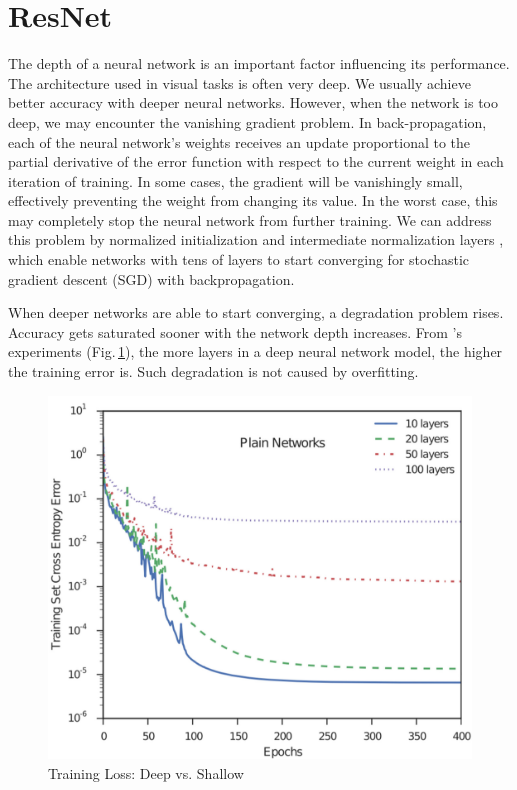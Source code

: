 \section{ResNet}

The depth of a neural network is an important factor influencing its performance. The architecture used in visual tasks is often very deep. We usually achieve better accuracy with deeper neural networks. However, when the network is too deep, we may encounter the vanishing gradient problem. In back-propagation, each of the neural network's weights receives an update proportional to the partial derivative of the error function with respect to the current weight in each iteration of training. In some cases, the gradient will be vanishingly small, effectively preventing the weight from changing its value. In the worst case, this may completely stop the neural network from further training. We can address this problem by normalized initialization and intermediate normalization layers \citep{Glorot10understandingthe}, which enable networks with tens of layers to start converging for stochastic gradient descent (SGD) with backpropagation. 

When deeper networks are able to start converging, a degradation problem rises. Accuracy gets saturated sooner with the network depth increases. From \citeauthor{Srivastava2015}'s experiments \cite{Srivastava2015}  (Fig.\,\ref{deeploss}), the more layers in a deep neural network model, the higher the training error is. Such degradation is not caused by overfitting.

\begin{figure}[h]
	\centering
	\includegraphics[scale=0.5]{Figs/deeploss.jpg}
    \caption{Training Loss: Deep vs. Shallow \cite{Srivastava2015}}
    \label{deeploss}
\end{figure}


